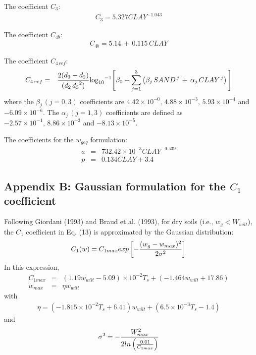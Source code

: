 The coefficient $C_3$:
\begin{eqnarray}
C_3 = 5.327 CLAY^{-1.043}
\end{eqnarray}

The coefficient $C_{4b}$:
\begin{eqnarray}
C_{4b} = 5.14 \,+\,0.115 \, CLAY
\end{eqnarray}

The coefficient $C_{4\,ref}$:
\begin{eqnarray}
C_{4\, ref} &=& {2(d_3-d_2)\over (d_2\,{d_3}^2)}
{\rm {log}_{10}}^{-1}
\Bigg[
\beta_0 +
\sum_{j=1}^3 \left( \beta_j \,{SAND}^{\,j} \,+\,
\alpha_j \,{CLAY}^{\,j} \right)
\Bigg]
\end{eqnarray}
%
where the $\beta_j \,(j=0,3)$ coefficients are
$4.42 \times {10}^{-0},\, 4.88 \times {10}^{-3},\,
5.93 \times {10}^{-4}$ and $-6.09 \times {10}^{-6}$.
The $\alpha_j \,(j=1,3)$ coefficients are defined as
$-2.57 \times {10}^{-1} ,\,
8.86 \times {10}^{-3}$ and
$-8.13 \times {10}^{-5}$.

The coefficients for the $w_{geq}$ formulation:
\begin{eqnarray}
a&=&732.42 \times 10^{-3} CLAY^{-0.539} \\
p&=&0.134 CLAY + 3.4
\end{eqnarray}

\subsection{Appendix B: Gaussian formulation for the $C_1$ coefficient}

Following Giordani (1993) and Braud et al. (1993),
for dry soils (i.e., $w_g < W_{wilt}$), the $C_1$ coefficient
in Eq. (13) is approximated by the Gaussian distribution:
\begin{eqnarray}
  C_1(w) = C_{1max} exp \left[ - {(w_g-w_{max})^2 \over 2 \sigma^2} \right]
\end{eqnarray}
In this expression,
\begin{eqnarray}
  C_{1max} &=& (1.19w_{wilt}-5.09) \times 10^{-2} T_s
           + (-1.464w_{wilt} + 17.86) \\
  w_{max}  &=& \eta w_{wilt}
\end{eqnarray}
with
\begin{eqnarray}
  \eta = (-1.815 \times 10^{-2} T_s + 6.41) w_{wilt}
       + (6.5 \times 10^{-3} T_s -1.4)
\end{eqnarray}
and
\begin{eqnarray}
  \sigma^2 = - {W^2_{max} \over 2 ln \left( {0.01 \over C_{1max} } \right) }
\end{eqnarray}


